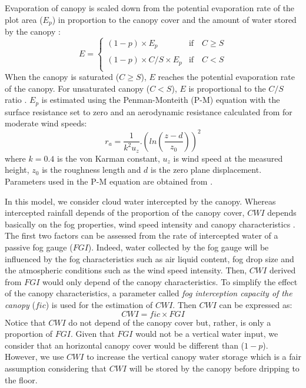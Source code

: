 \documentclass[a4paper,12pt]{article}
\begin{document}
\begin{linenumbers}
Evaporation of canopy is scaled down from the potential evaporation rate of the plot area ($E_p$) in proportion to the canopy cover and the amount of water stored by the canopy \citep{Pryetetal2012a}:
\begin{equation} \label{eq:fog_evaporation}
E=%
  \begin{cases}
    (1-p) \times E_p & \mathrm{if} \quad C \geq S \\
    \\
    (1-p) \times C/S \times E_p & \mathrm{if} \quad C < S \\
  \end{cases}
\end{equation}
When the canopy is saturated ($C \geq S$), $E$ reaches the potential evaporation rate of the canopy. For unsaturated canopy ($C < S$), $E$ is proportional to the $C/S$ ratio \citep{Rutter1975, WhiteheadandKelliher1991, Valenteetal1997}. $E_p$ is estimated using the Penman-Monteith (P-M) equation \citep{Monteith1965} with the surface resistance set to zero \citep{Rutter1975, Kelliheretal1993, Muzyloetal2009} and an aerodynamic resistance  calculated from \cite{Rutter1971,Rutter1975} for moderate wind speeds:
\begin{equation} \label{eq:ra}
    r_a = \dfrac{1}{k^2u_z}.\left(ln \left(\dfrac{z-d}{z_0} \right) \right)^2  
\end{equation}
where $k=0.4$ is the von Karman constant, $u_z$ is wind speed at the measured height, $z_0$ is the roughness length and $d$ is the zero plane displacement. Parameters used in the P-M equation are obtained from \cite{Pryetetal2012a}.  


In this model, we consider cloud water intercepted by the canopy. Whereas intercepted rainfall depends of the proportion of the canopy cover, $CWI$ depends basically on the fog properties, wind speed intensity and canopy characteristics \citep{Bruijnzeeletal2006, Villegasetal2008, Holwerdaetal2010, Pryetetal2012a}. The first two factors can be assessed from the rate of intercepted water of a passive fog gauge ($FGI$). Indeed, water collected by the fog gauge will be influenced by the fog characteristics such as air liquid content, fog drop size and the atmospheric conditions such as the wind speed intensity. Then, $CWI$ derived from $FGI$ would only depend of the canopy characteristics. To simplify the effect of the canopy characteristics, a parameter called \textit{fog interception capacity of the canopy} ($fic$) is used for the estimation of $CWI$. Then $CWI$ can be expressed as:
\begin{equation} \label{eq:fog_wi}
    CWI = fic \times FGI
\end{equation}
Notice that $CWI$ do not depend of the canopy cover but, rather, is only a proportion of $FGI$. Given that $FGI$ would not be a vertical water input, we consider that an horizontal canopy cover would be different than ($1-p$). However, we use $CWI$ to increase the vertical canopy water storage which is a fair assumption considering that $CWI$ will be stored by the canopy before dripping to the floor. 


\end{linenumbers}
\end{document}
